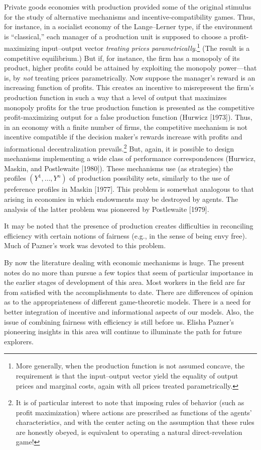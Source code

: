 \documentclass[12pt, letterpaper]{article}
\begin{document}
Private goods economies with production provided some of the original stimulus for the study of alternative mechanisms and incentive-compatibility games. Thus, for instance, in a socialist economy of the Lange--Lerner type, if the environment is ``classical,'' each manager of a production unit is supposed to choose a profit-maximizing input--output vector \textit{treating prices parametrically}.\footnote{More generally, when the production function is not assumed concave, the requirement is that the input--output vector yield the equality of output prices and marginal costs, again with all prices treated parametrically.} (The result is a competitive equilibrium.) But if, for instance, the firm has a monopoly of its product, higher profits could be attained by exploiting the monopoly power---that is, by \textit{not} treating prices parametrically. Now suppose the manager's reward is an increasing function of profits. This creates an incentive to misrepresent the firm's production function in such a way that a level of output that maximizes monopoly profits for the true production function is presented as the competitive profit-maximizing output for a false production function (Hurwicz [1973]). Thus, in an economy with a finite number of firms, the competitive mechanism is not incentive compatible if the decision maker's rewards increase with profits and informational decentralization prevails.\footnote{It is of particular interest to note that imposing rules of behavior (such as profit maximization) where actions are prescribed as functions of the agents' characteristics, and with the center acting on the assumption that these rules are honestly obeyed, is equivalent to operating a natural direct-revelation game!} But, again, it is possible to design mechanisms implementing a wide class of performance correspondences (Hurwicz, Maskin, and Postlewaite [1980]). These mechanisms use (as strategies) the profiles $(Y^1, \dots, Y^n)$ of production possibility sets, similarly to the use of preference profiles in Maskin [1977]. This problem is somewhat analogous to that arising in economies in which endowments may be destroyed by agents. The analysis of the latter problem was pioneered by Postlewaite [1979].

It may be noted that the presence of production creates difficulties in reconciling efficiency with certain notions of fairness (e.g., in the sense of being envy free). Much of Pazner's work was devoted to this problem.

\medskip

By now the literature dealing with economic mechanisms is huge. The present notes do no more than pursue a few topics that seem of particular importance in the earlier stages of development of this area. Most workers in the field are far from satisfied with the accomplishments to date. There are differences of opinion as to the appropriateness of different game-theoretic models. There is a need for better integration of incentive and informational aspects of our models. Also, the issue of combining fairness with efficiency is still before us. Elisha Pazner's pioneering insights in this area will continue to illuminate the path for future explorers.
\end{document}
